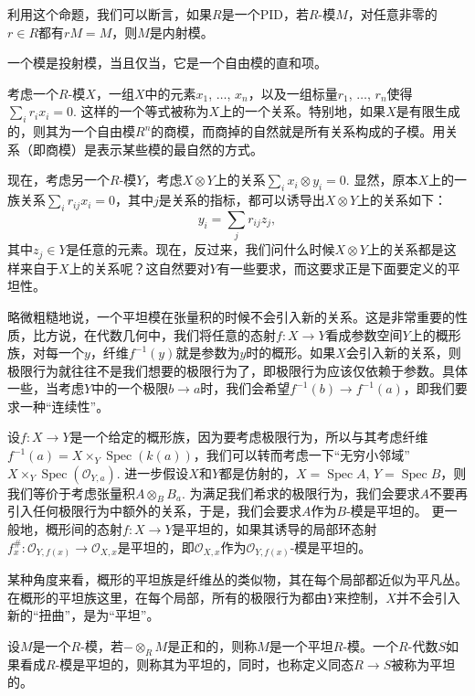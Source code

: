 利用这个命题，我们可以断言，如果$R$是一个PID，若$R$-模$M$，对任意非零的$r\in R$都有$rM=M$，则$M$是内射模。 

\begin{pro}
	一个模是投射模，当且仅当，它是一个自由模的直和项。
\end{pro}



\begin{para}[关系]
	考虑一个$R$-模$X$，一组$X$中的元素$x_1$, $\dots$, $x_n$，以及一组标量$r_1$, $\dots$, $r_n$使得$\sum_{i}r_ix_i=0$. 这样的一个等式被称为$X$上的一个关系。特别地，如果$X$是有限生成的，则其为一个自由模$R^n$的商模，而商掉的自然就是所有关系构成的子模。用关系（即商模）是表示某些模的最自然的方式。

	现在，考虑另一个$R$-模$Y$，考虑$X\otimes Y$上的关系$\sum_i x_i\otimes y_i=0$. 显然，原本$X$上的一族关系$\sum_i r_{ij}x_i=0$，其中$j$是关系的指标，都可以诱导出$X\otimes Y$上的关系如下：
	\[
		y_i=\sum_{j}r_{ij} z_j,
	\]
	其中$z_j\in Y$是任意的元素。现在，反过来，我们问什么时候$X\otimes Y$上的关系都是这样来自于$X$上的关系呢？这自然要对$Y$有一些要求，而这要求正是下面要定义的平坦性。
	
	略微粗糙地说，一个平坦模在张量积的时候不会引入新的关系。这是非常重要的性质，比方说，在代数几何中，我们将任意的态射$f:X\to Y$看成参数空间$Y$上的概形族，对每一个$y$，纤维$f^{-1}(y)$就是参数为$y$时的概形。如果$X$会引入新的关系，则极限行为就往往不是我们想要的极限行为了，即极限行为应该仅依赖于参数。具体一些，当考虑$Y$中的一个极限$b\to a$时，我们会希望$f^{-1}(b)\to f^{-1}(a)$，即我们要求一种“连续性”。
	
	设$f:X\to Y$是一个给定的概形族，因为要考虑极限行为，所以与其考虑纤维$f^{-1}(a)=X\times_Y \operatorname{Spec}(k(a))$，我们可以转而考虑一下“无穷小邻域”$X\times_Y \operatorname{Spec}(\mathcal O_{Y,a})$. 进一步假设$X$和$Y$都是仿射的，$X=\operatorname{Spec} A$, $Y=\operatorname{Spec} B$，则我们等价于考虑张量积$A\otimes_B B_{a}$. 为满足我们希求的极限行为，我们会要求$A$不要再引入任何极限行为中额外的关系，于是，我们会要求$A$作为$B$-模是平坦的。
	更一般地，概形间的态射$f:X\to Y$是平坦的，如果其诱导的局部环态射$f^\#_{x}:\mathcal O_{Y,f(x)}\to \mathcal O_{X,x}$是平坦的，即$\mathcal O_{X,x}$作为$\mathcal O_{Y,f(x)}$-模是平坦的。

	某种角度来看，概形的平坦族是纤维丛的类似物，其在每个局部都近似为平凡丛。在概形的平坦族这里，在每个局部，所有的极限行为都由$Y$来控制，$X$并不会引入新的“扭曲”，是为“平坦”。
\end{para}

\begin{para}[平坦性]
	设$M$是一个$R$-模，若$-\otimes_R M$是正和的，则称$M$是一个平坦$R$-模。一个$R$-代数$S$如果看成$R$-模是平坦的，则称其为平坦的，同时，也称定义同态$R\to S$被称为平坦的。
\end{para}

